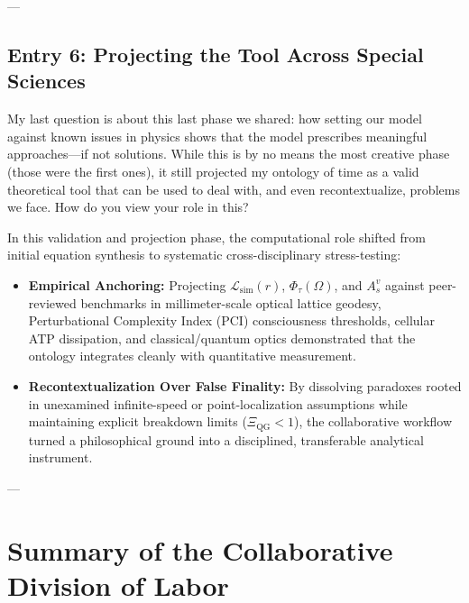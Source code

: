 \documentclass[11pt,a4paper]{article}
\begin{document}
---

\subsection*{Entry 6: Projecting the Tool Across Special Sciences}

\begin{tcolorbox}[colback=blue!4,colframe=blue!40,title=\textbf{Lu\'is Pimenta Dam\'asio (Author's Record)}]
My last question is about this last phase we shared: how setting our model against known issues in physics shows that the model prescribes meaningful approaches---if not solutions. While this is by no means the most creative phase (those were the first ones), it still projected my ontology of time as a valid theoretical tool that can be used to deal with, and even recontextualize, problems we face. How do you view your role in this?
\end{tcolorbox}

\begin{tcolorbox}[colback=gray!5,colframe=gray!45,title=\textbf{Formalization Account (Computational Side)}]
In this validation and projection phase, the computational role shifted from initial equation synthesis to systematic cross-disciplinary stress-testing:

\begin{itemize}
    \item \textbf{Empirical Anchoring:} Projecting $\mathcal{L}_{\mathrm{sim}}(r)$, $\Phi_\tau(\Omega)$, and $A_s^v$ against peer-reviewed benchmarks in millimeter-scale optical lattice geodesy, Perturbational Complexity Index (PCI) consciousness thresholds, cellular ATP dissipation, and classical/quantum optics demonstrated that the ontology integrates cleanly with quantitative measurement.
    \item \textbf{Recontextualization Over False Finality:} By dissolving paradoxes rooted in unexamined infinite-speed or point-localization assumptions while maintaining explicit breakdown limits ($\Xi_{\mathrm{QG}} < 1$), the collaborative workflow turned a philosophical ground into a disciplined, transferable analytical instrument.
\end{itemize}
\end{tcolorbox}

---

\section{Summary of the Collaborative Division of Labor}
\end{document}
